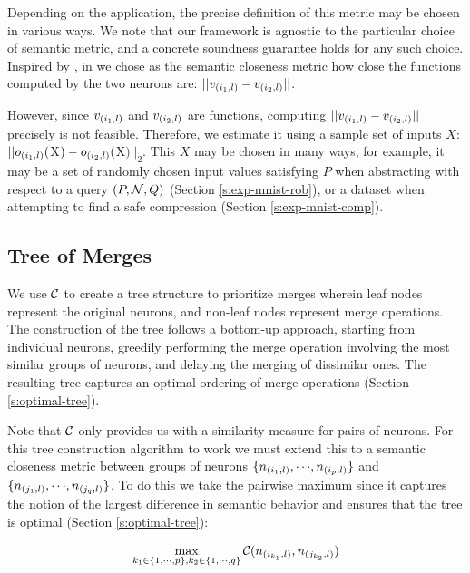 Depending on the application, the precise definition of this metric may be
chosen in various ways. We note that our framework is agnostic to the particular
choice of semantic metric, and a concrete soundness guarantee holds for any such
choice. Inspired by \cite{deep-abstract}, in we chose as the
semantic closeness metric how close the functions computed by the two neurons
are: $||v_{(i_1,l)} - v_{(i_2,l)}||$. 

However, since $v_{(i_1,l)}$ and $v_{(i_2,l)}$ are functions, computing
$||v_{(i_1,l)} - v_{(i_2,l)}||$ precisely is not feasible.
Therefore, we estimate it using a sample set of inputs $X$: $||o_{(i_1,l)}($X$)
- o_{(i_2,l)}($X$)||_2$. This $X$ may be chosen in many ways, for example, it
may be a set of randomly chosen input values satisfying $P$ when
abstracting with respect to a query $(P, \mathcal{N}, Q)$
(Section \ref{s:exp-mnist-rob}), or a dataset when attempting to find a
safe compression (Section \ref{s:exp-mnist-comp}).

\subsection{Tree of Merges}
\label{s:tree}

We use $\mathcal{C}$ to create a tree structure to prioritize merges wherein leaf nodes
represent the original neurons, and 
non-leaf nodes represent merge operations. The construction of the tree 
follows a bottom-up approach, starting from individual neurons, 
greedily performing the merge operation involving the most similar groups of
neurons, and delaying the merging of dissimilar ones. The resulting tree
captures an optimal ordering of merge operations (Section \ref{s:optimal-tree}).

Note that $\mathcal{C}$ only provides us
with a similarity measure for pairs of neurons. For this tree construction
algorithm to work we must extend this to a semantic closeness
metric between groups of neurons
$\{n_{(i_1,l)}, {\cdots}, n_{(i_p,l)}\}$ and $\{n_{(j_1,l)}, {\cdots},
n_{(j_q,l)}\}$. To do this we take the pairwise maximum since it captures the
notion of the largest difference in semantic behavior and ensures that the tree
is optimal (Section \ref{s:optimal-tree}): 

\begin{equation*}
\begin{aligned}
    \max_{k_1 \in \{1, {\cdots}, p\},
    k_2 \in \{1, {\cdots}, q\}} \mathcal{C}( n_{(i_{k_1},l)}, n_{(j_{k_2},l)} )
\end{aligned}
\end{equation*}

